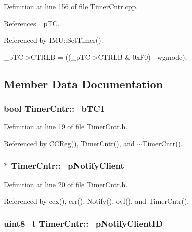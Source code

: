 Definition at line 156 of file TimerCntr.cpp.



References \_\-pTC.



Referenced by IMU::SetTimer().


\begin{DoxyCode}
{
    _pTC->CTRLB = ((_pTC->CTRLB & 0xF0) | wgmode);
}
\end{DoxyCode}


\subsection{Member Data Documentation}
\hypertarget{class_timer_cntr_a568c634a1b85c88206408c5108500c7b}{
\subsubsection[{\_\-bTC1}]{\setlength{\rightskip}{0pt plus 5cm}bool {\bf TimerCntr::\_\-bTC1}}}
\label{class_timer_cntr_a568c634a1b85c88206408c5108500c7b}


Definition at line 19 of file TimerCntr.h.



Referenced by CCReg(), TimerCntr(), and $\sim$TimerCntr().

\hypertarget{class_timer_cntr_ab0667571f2dab6ca9f759d9b2c8ce59f}{
\subsubsection[{\_\-pNotifyClient}]{$\ast$ {\bf TimerCntr::\_\-pNotifyClient}}}
\label{class_timer_cntr_ab0667571f2dab6ca9f759d9b2c8ce59f}


Definition at line 20 of file TimerCntr.h.



Referenced by ccx(), err(), Notify(), ovf(), and TimerCntr().

\hypertarget{class_timer_cntr_a98b954b9492a11842e511fa21d0131cc}{
\subsubsection[{\_\-pNotifyClientID}]{\setlength{\rightskip}{0pt plus 5cm}uint8\_\-t {\bf TimerCntr::\_\-pNotifyClientID}}}
\label{class_timer_cntr_a98b954b9492a11842e511fa21d0131cc}


